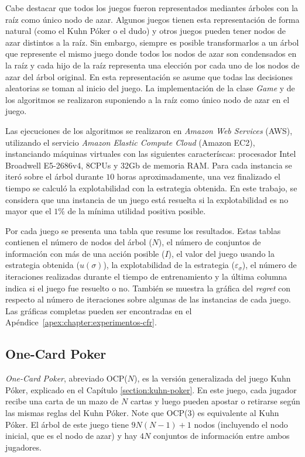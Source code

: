 Cabe destacar que todos los juegos fueron representados mediantes árboles con la raíz como único nodo de azar. Algunos juegos tienen esta representación de forma natural (como el Kuhn Póker o el dudo) y otros juegos pueden tener nodos de azar distintos a la raíz. Sin embargo, siempre es posible transformarlos a un árbol que represente el mismo juego donde todos los nodos de azar son condensados en la raíz y cada hijo de la raíz representa una elección por cada uno de los nodos de azar del árbol original. En esta representación se asume que todas las decisiones aleatorias se toman al inicio del juego. La implementación de la clase \textit{Game} y de los algoritmos se realizaron suponiendo a la raíz como único nodo de azar en el juego.

Las ejecuciones de los algoritmos se realizaron en \textit{Amazon Web Services} (AWS), utilizando el servicio \textit{Amazon Elastic Compute Cloud} (Amazon EC2), instanciando máquinas virtuales con las siguientes caracteríscas: procesador Intel Broadwell E5-2686v4, 8CPUs y 32Gb de memoria RAM. Para cada instancia se iteró sobre el árbol durante $10$ horas aproximadamente, una vez finalizado el tiempo se calculó la explotabilidad con la estrategia obtenida. En este trabajo, se considera que una instancia de un juego está resuelta si la explotabilidad es no mayor que el $1\%$ de la mínima utilidad positiva posible.

Por cada juego se presenta una tabla que resume los resultados. Estas tablas contienen el número de nodos del árbol ($N$), el número de conjuntos de información con más de una acción posible ($I$), el valor del juego usando la estrategia obtenida ($u({\sigma})$), la explotabilidad de la estrategia ($\varepsilon_{\sigma}$), el número de iteraciones realizadas durante el tiempo de entrenamiento y la última columna indica si el juego fue resuelto o no. También se muestra la gráfica del \textit{regret} con respecto al número de iteraciones sobre algunas de las instancias de cada juego. Las gráficas completas pueden ser encontradas en el Apéndice~\ref{apex:chapter:experimentos-cfr}.

\subsection*{One-Card Poker}
\textit{One-Card Poker}, abreviado OCP($N$), es la versión generalizada del juego Kuhn Póker, explicado en el Capítulo \ref{section:kuhn-poker}. En este juego, cada jugador recibe una carta de un mazo de $N$ cartas y luego pueden apostar o retirarse según las mismas reglas del Kuhn Póker. Note que OCP(3) es equivalente al Kuhn Póker. El árbol de este juego tiene $9N(N-1)+1$ nodos (incluyendo el nodo inicial, que es el nodo de azar) y hay $4N$ conjuntos de información entre ambos jugadores. 

